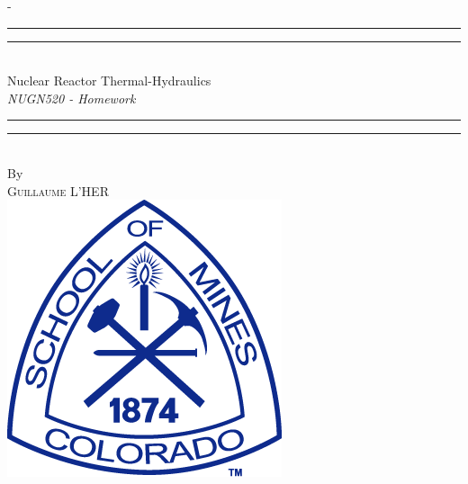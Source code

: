 %
%
% 
%
%
\begin{titlingpage}
\begin{SingleSpace}
\calccentering{\unitlength} 
\begin{adjustwidth*}{\unitlength}{-\unitlength}
\vspace*{13mm}
\begin{center}
\rule[0.5ex]{\linewidth}{2pt}\vspace*{-\baselineskip}\vspace*{3.2pt}
\rule[0.5ex]{\linewidth}{1pt}\\[\baselineskip]
{\HUGE Nuclear Reactor Thermal-Hydraulics }\\[4mm]
{\Large \textit{NUGN520 - Homework}}\\
\rule[0.5ex]{\linewidth}{1pt}\vspace*{-\baselineskip}\vspace{3.2pt}
\rule[0.5ex]{\linewidth}{2pt}\\
\vspace{6.5mm}
{\large By}\\
\vspace{6.5mm}
{\large\textsc{Guillaume L'HER}}\\
\vspace{11mm}
\includegraphics[scale=0.6]{logos/CSM}\\

\end{center}
\end{adjustwidth*}
\end{SingleSpace}
\end{titlingpage}
